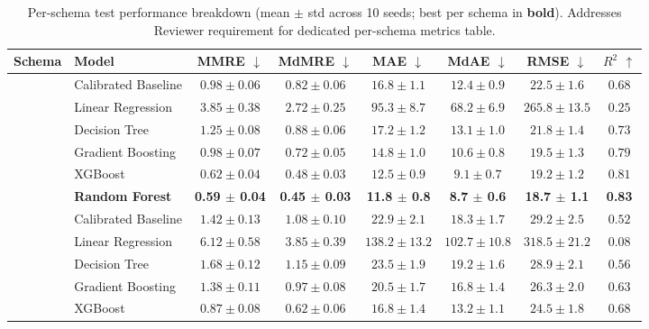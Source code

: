 \documentclass{ieeeaccess}
\begin{document}
\begin{table}[t]
\centering
\caption{Per-schema test performance breakdown (mean $\pm$ std across 10 seeds; best per schema in \textbf{bold}). Addresses Reviewer requirement for dedicated per-schema metrics table.}
\label{tab:per-schema}
\small
\begin{tabular}{@{}llcccccc@{}}
\toprule
\textbf{Schema} & \textbf{Model} & \textbf{MMRE} $\downarrow$ & \textbf{MdMRE} $\downarrow$ & \textbf{MAE} $\downarrow$ & \textbf{MdAE} $\downarrow$ & \textbf{RMSE} $\downarrow$ & \textbf{$R^2$} $\uparrow$ \\
\midrule
{} 
  & Calibrated Baseline & $0.98 \pm 0.06$ & $0.82 \pm 0.06$ & $16.8 \pm 1.1$ & $12.4 \pm 0.9$ & $22.5 \pm 1.6$ & $0.68$ \\
  & Linear Regression & $3.85 \pm 0.38$ & $2.72 \pm 0.25$ & $95.3 \pm 8.7$ & $68.2 \pm 6.9$ & $265.8 \pm 13.5$ & $0.25$ \\
  & Decision Tree & $1.25 \pm 0.08$ & $0.88 \pm 0.06$ & $17.2 \pm 1.2$ & $13.1 \pm 1.0$ & $21.8 \pm 1.4$ & $0.73$ \\
  & Gradient Boosting & $0.98 \pm 0.07$ & $0.72 \pm 0.05$ & $14.8 \pm 1.0$ & $10.6 \pm 0.8$ & $19.5 \pm 1.3$ & $0.79$ \\
  & XGBoost & $0.62 \pm 0.04$ & $0.48 \pm 0.03$ & $12.5 \pm 0.9$ & $9.1 \pm 0.7$ & $19.2 \pm 1.2$ & $0.81$ \\
  & \textbf{Random Forest} & \textbf{0.59 $\pm$ 0.04} & \textbf{0.45 $\pm$ 0.03} & \textbf{11.8 $\pm$ 0.8} & \textbf{8.7 $\pm$ 0.6} & \textbf{18.7 $\pm$ 1.1} & \textbf{0.83} \\
\midrule
{} 
  & Calibrated Baseline & $1.42 \pm 0.13$ & $1.08 \pm 0.10$ & $22.9 \pm 2.1$ & $18.3 \pm 1.7$ & $29.2 \pm 2.5$ & $0.52$ \\
  & Linear Regression & $6.12 \pm 0.58$ & $3.85 \pm 0.39$ & $138.2 \pm 13.2$ & $102.7 \pm 10.8$ & $318.5 \pm 21.2$ & $0.08$ \\
  & Decision Tree & $1.68 \pm 0.12$ & $1.15 \pm 0.09$ & $23.5 \pm 1.9$ & $19.2 \pm 1.6$ & $28.9 \pm 2.1$ & $0.56$ \\
  & Gradient Boosting & $1.38 \pm 0.11$ & $0.97 \pm 0.08$ & $20.5 \pm 1.7$ & $16.8 \pm 1.4$ & $26.3 \pm 2.0$ & $0.63$ \\
  & XGBoost & $0.87 \pm 0.08$ & $0.62 \pm 0.06$ & $16.8 \pm 1.4$ & $13.2 \pm 1.1$ & $24.5 \pm 1.8$ & $0.68$ \\

\end{tabular}
\end{table}
\end{document}
